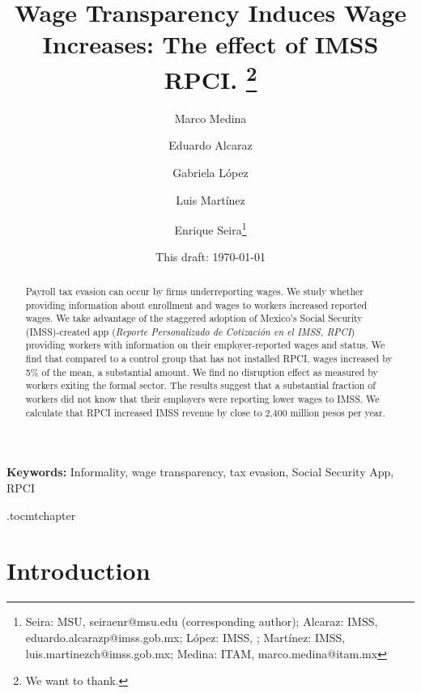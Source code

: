 \documentclass[oneside,11pt]{article}
\begin{document}
\title{Wage Transparency Induces Wage Increases: The effect of IMSS RPCI. \thanks{We want to thank.}}
\author{Marco Medina \and Eduardo Alcaraz \and Gabriela López \and Luis Martínez \and Enrique Seira\thanks{Seira: MSU, seiraenr@msu.edu (corresponding author); Alcaraz: IMSS, eduardo.alcarazp@imss.gob.mx; López: IMSS, ; Martínez: IMSS, luis.martinezch@imss.gob.mx; Medina:  ITAM, marco.medina@itam.mx}}
\date{This draft:  \today \\[2 cm]}  %




\maketitle
\thispagestyle{empty}
\begin{abstract}

Payroll tax evasion can occur by firms underreporting wages. We study whether providing information about enrollment and wages to workers increased reported wages.
We take advantage of the staggered adoption of Mexico's Social Security (IMSS)-created app (\textit{Reporte Personalizado de Cotización en el IMSS, RPCI}) providing workers with information on their employer-reported wages and status. We find that compared to a control group that has not installed RPCI, wages increased by 5\% of the mean, a substantial amount. We find no disruption effect as measured by workers exiting the formal sector. The results suggest that a substantial fraction of workers did not know that their employers were reporting lower wages to IMSS. We calculate that RPCI increased IMSS revenue by close to 2,400 million pesos per year.

\end{abstract}

\vspace{.3in}

\textbf{Keywords:} Informality, wage transparency, tax evasion, Social Security App, RPCI


\newpage

\etocdepthtag.toc{mtchapter}

\section{Introduction} \label{introduction}
\end{document}
